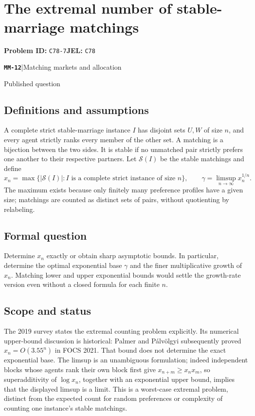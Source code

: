 \documentclass[11pt,a4paper]{article}
\newcommand{\entrymeta}[3]{{\sffamily\small\color{muted}\textbf{\texttt{#1}}\quad|\quad #2\par #3\par}}
\begin{document}
\section*{The extremal number of stable-marriage matchings}
\textbf{Problem ID:} \texttt{C78-7}\quad \textbf{JEL:} \texttt{C78}\par
\label{problem:OP-0553}
\label{beyond:MM-12}
\entrymeta{MM-12}{Matching markets and allocation}{Published question}
\subsection*{Definitions and assumptions}
A complete strict stable-marriage instance $I$ has disjoint sets $U,W$ of size $n$, and every agent strictly ranks every member of the other set. A matching is a bijection between the two sides. It is stable if no unmatched pair strictly prefers one another to their respective partners. Let $\mathcal S(I)$ be the stable matchings and define
\[
 x_n=\max\{|\mathcal S(I)|:I\text{ is a complete strict instance of size }n\},
 \qquad \gamma=\limsup_{n\to\infty}x_n^{1/n}.
\]
The maximum exists because only finitely many preference profiles have a given size; matchings are counted as distinct sets of pairs, without quotienting by relabeling.
\subsection*{Formal question}
Determine $x_n$ exactly or obtain sharp asymptotic bounds. In particular, determine the optimal exponential base $\gamma$ and the finer multiplicative growth of $x_n$. Matching lower and upper exponential bounds would settle the growth-rate version even without a closed formula for each finite $n$.
\subsection*{Scope and status}
The 2019 survey states the extremal counting problem explicitly. Its numerical upper-bound discussion is historical: Palmer and P\'alv\"olgyi subsequently proved $x_n=O(3.55^n)$ in FOCS 2021. That bound does not determine the exact exponential base. The limsup is an unambiguous formulation; indeed independent blocks whose agents rank their own block first give $x_{n+m}\ge x_nx_m$, so superadditivity of $\log x_n$, together with an exponential upper bound, implies that the displayed limsup is a limit. This is a worst-case extremal problem, distinct from the expected count for random preferences or complexity of counting one instance's stable matchings.
\end{document}

